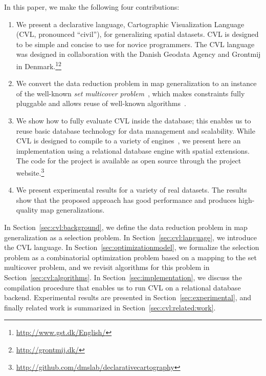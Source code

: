 \documentclass[11pt, oneside]{report}
\begin{document}
In this paper, we make the following four contributions:
\begin{enumerate}
\item We present a declarative language, Cartographic Visualization Language (CVL, pronounced ``civil''), for generalizing spatial datasets. CVL is designed to be simple and concise to use for novice programmers. The CVL language was designed in collaboration with the Danish Geodata Agency and Grontmij in Denmark.\footnote{\url{http://www.gst.dk/English/}}\footnote{\url{http://grontmij.dk/}}

\item We convert the data reduction problem in map generalization to an instance of the well-known \emph{set multicover problem}~\cite{rajagopalan1998primal}, which makes constraints fully pluggable and allows reuse of well-known algorithms~\cite{rajagopalan1998primal,vazirani2001approximation}.

\item We show how to fully evaluate CVL inside the database; this enables us to reuse basic database technology for data management and scalability. While CVL is designed to compile to a variety of engines~\cite{Stonebraker:2010:PDBMSvsMapReduce}, we present here an implementation using a relational database engine with spatial extensions. The code for the project is available as open source through the project website.\footnote{\url{http://github.com/dmslab/declarativecartography}}

\item We present experimental results for a variety of real datasets. The results show that the proposed approach has good performance and produces high-quality map generalizations.
\end{enumerate}

In Section~\ref{sec:cvl:background}, we define the data reduction problem in map generalization as a selection problem. In Section~\ref{sec:cvl:language}, we introduce the CVL language. In Section~\ref{sec:optimizationmodel}, we formalize the selection problem as a combinatorial optimization problem based on a mapping to the set multicover problem, and we revisit algorithms for this problem in Section~\ref{sec:cvl:algorithms}. In Section~\ref{sec:implementation}, we discuss the compilation procedure that enables us to run CVL on a relational database backend. Experimental results are presented in Section~\ref{sec:experimental}, and finally related work is summarized in Section~\ref{sec:cvl:related:work}.
\end{document}
